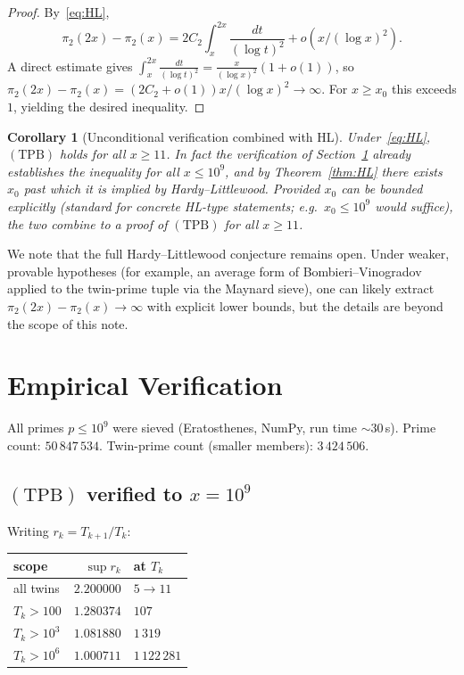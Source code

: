 \documentclass[11pt]{article}
\newtheorem{corollary}[theorem]{Corollary}
\begin{document}
\begin{proof}
By~\eqref{eq:HL},
\[
\pi_2(2x)-\pi_2(x)=2C_2\int_x^{2x}\frac{dt}{(\log t)^2}+o(x/(\log x)^2).
\]
A direct estimate gives
$\int_x^{2x}\frac{dt}{(\log t)^2}=\frac{x}{(\log x)^2}(1+o(1))$, so
$\pi_2(2x)-\pi_2(x)=(2C_2+o(1))x/(\log x)^2\to\infty$.
For $x\ge x_0$ this exceeds $1$, yielding the desired inequality.
\end{proof}

\begin{corollary}[Unconditional verification combined with HL]
Under~\eqref{eq:HL}, $(\mathrm{TPB})$ holds for all $x\ge 11$. In fact
the verification of Section~\ref{sec:empirical} already establishes
the inequality for all $x\le 10^9$, and by Theorem~\ref{thm:HL} there
exists $x_0$ past which it is implied by Hardy--Littlewood. Provided
$x_0$ can be bounded explicitly (standard for concrete HL-type
statements; e.g.\ $x_0\le 10^9$ would suffice), the two combine to a
proof of $(\mathrm{TPB})$ for all $x\ge 11$.
\end{corollary}

We note that the full Hardy--Littlewood conjecture remains open. Under
weaker, provable hypotheses (for example, an average form of Bombieri--Vinogradov
applied to the twin-prime tuple via the Maynard sieve), one can
likely extract $\pi_2(2x)-\pi_2(x)\to\infty$ with explicit lower
bounds, but the details are beyond the scope of this note.

\section{Empirical Verification}\label{sec:empirical}

All primes $p\le 10^9$ were sieved (Eratosthenes, NumPy, run time
$\sim$30\,s). Prime count: $50\,847\,534$. Twin-prime count (smaller
members): $3\,424\,506$.

\subsection{$(\mathrm{TPB})$ verified to $x=10^9$}

Writing $r_k=T_{k+1}/T_k$:

\begin{center}
\begin{tabular}{lrl}
\toprule
scope & $\sup r_k$ & at $T_k$ \\
\midrule
all twins & $2.200000$ & $5\to 11$ \\
$T_k>100$ & $1.280374$ & $107$ \\
$T_k>10^3$ & $1.081880$ & $1\,319$ \\
$T_k>10^6$ & $1.000711$ & $1\,122\,281$ \\
\bottomrule
\end{tabular}
\end{center}
\end{document}
